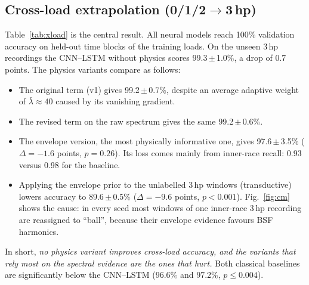 \documentclass[conference]{IEEEtran}
\begin{document}
\subsection{Cross-load extrapolation (0/1/2$\to$3\,hp)}
Table~\ref{tab:xload} is the central result. All neural models reach 100\%
validation accuracy on held-out time blocks of the training loads. On the
unseen 3\,hp recordings the CNN--LSTM without physics scores
99.3\,$\pm$\,1.0\%, a drop of 0.7 points. The physics variants compare as
follows:
\begin{itemize}
\item The original term (v1) gives 99.2\,$\pm$\,0.7\%, despite an average
adaptive weight of $\bar\lambda\approx40$ caused by its vanishing gradient.
\item The revised term on the raw spectrum gives the same 99.2\,$\pm$\,0.6\%.
\item The envelope version, the most physically informative one, gives
97.6\,$\pm$\,3.5\% ($\Delta=-1.6$ points, $p=0.26$). Its loss comes mainly from
inner-race recall: 0.93 versus 0.98 for the baseline.
\item Applying the envelope prior to the unlabelled 3\,hp windows
(transductive) lowers accuracy to 89.6\,$\pm$\,0.5\% ($\Delta=-9.6$ points,
$p<0.001$). Fig.~\ref{fig:cm} shows the cause: in every seed most windows of
one inner-race 3\,hp recording are reassigned to ``ball'', because their
envelope evidence favours BSF harmonics.
\end{itemize}
In short, \emph{no physics variant improves cross-load accuracy, and the
variants that rely most on the spectral evidence are the ones that hurt.}
Both classical baselines are significantly below the CNN--LSTM (96.6\% and
97.2\%, $p\le0.004$).
\end{document}
